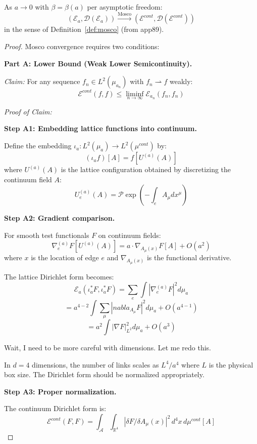 \begin{theorem}
\label{thm:mosco-complete}
As $a \to 0$ with $\beta = \beta(a)$ per asymptotic freedom:
\[
(\mathcal{E}_a, \mathcal{D}(\mathcal{E}_a)) \xrightarrow{\text{Mosco}} (\mathcal{E}^{cont}, \mathcal{D}(\mathcal{E}^{cont}))
\]
in the sense of Definition~\ref{def:mosco} (from app89).
\end{theorem}

\begin{proof}
Mosco convergence requires two conditions:

\textbf{Part A: Lower Bound (Weak Lower Semicontinuity).}

\textit{Claim:} For any sequence $f_n \in L^2(\mu_{a_n})$ with $f_n \rightharpoonup f$ weakly:
\[
\mathcal{E}^{cont}(f, f) \leq \liminf_{n \to \infty} \mathcal{E}_{a_n}(f_n, f_n)
\]

\textit{Proof of Claim:}

\textbf{Step A1: Embedding lattice functions into continuum.}

Define the embedding $\iota_a: L^2(\mu_a) \to L^2(\mu^{cont})$ by:
\[
(\iota_a f)[A] = f[U^{(a)}(A)]
\]
where $U^{(a)}(A)$ is the lattice configuration obtained by discretizing 
the continuum field $A$:
\[
U_e^{(a)}(A) = \mathcal{P}\exp\left(-\int_e A_\mu dx^\mu\right)
\]

\textbf{Step A2: Gradient comparison.}

For smooth test functionals $F$ on continuum fields:
\[
\nabla_e^{(a)} F[U^{(a)}(A)] = a \cdot \nabla_{A_\mu(x)} F[A] + O(a^2)
\]
where $x$ is the location of edge $e$ and $\nabla_{A_\mu(x)}$ is the functional derivative.

The lattice Dirichlet form becomes:
\[
\mathcal{E}_a(\iota_a^* F, \iota_a^* F) = \sum_e \int |\nabla_e^{(a)} F|^2 d\mu_a
\]
\[
= a^{4-2} \int \sum_\mu |nabla_{A_\mu} F|^2 d\mu_a + O(a^{4-1})
\]
\[
= a^2 \int |\nabla F|_{L^2}^2 d\mu_a + O(a^3)
\]

Wait, I need to be more careful with dimensions. Let me redo this.

In $d = 4$ dimensions, the number of links scales as $L^4/a^4$ where $L$ is the 
physical box size. The Dirichlet form should be normalized appropriately.

\textbf{Step A3: Proper normalization.}

The continuum Dirichlet form is:
\[
\mathcal{E}^{cont}(F, F) = \int_{\mathcal{A}} \int_{\mathbb{R}^4} |\delta F / \delta A_\mu(x)|^2 \, d^4x \, d\mu^{cont}[A]
\]


\end{proof}
